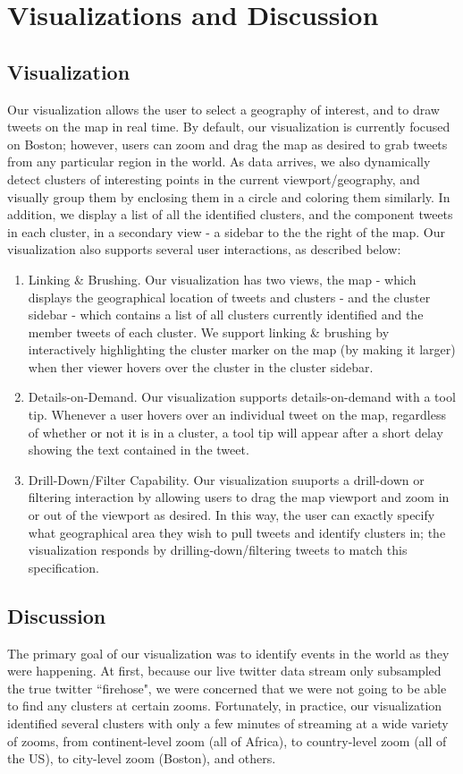 \documentclass[pdftex,12pt,a4paper]{article}
\begin{document}
\section{Visualizations and Discussion} 
\subsection{Visualization}
Our visualization allows the user to select a geography of interest, and to draw tweets on the map in real time. By default, our visualization is currently focused on Boston; however, users can zoom and drag the map as desired to grab tweets from any particular region in the world. As data arrives, we also dynamically detect clusters of interesting points in the current viewport/geography, and visually group them by enclosing them in a circle and coloring them similarly. In addition, we display a list of all the identified clusters, and the component tweets in each cluster, in a secondary view - a sidebar to the the right of the map. Our visualization also supports several user interactions, as described below:
\begin{enumerate}
\item Linking \& Brushing. Our visualization has two views, the map - which displays the geographical location of tweets and clusters - and the cluster sidebar - which contains a list of all clusters currently identified and the member tweets of each cluster. We support linking \& brushing by interactively highlighting the cluster marker on the map (by making it larger) when ther viewer hovers over the cluster in the cluster sidebar. 
\item Details-on-Demand. Our visualization supports details-on-demand with a tool tip. Whenever a user hovers over an individual tweet on the map, regardless of whether or not it is in a cluster, a tool tip will appear after a short delay showing the text contained in the tweet. 
\item Drill-Down/Filter Capability. Our visualization suuports a drill-down or filtering interaction by allowing users to drag the map viewport and zoom in or out of the viewport as desired. In this way, the user can exactly specify what geographical area they wish to pull tweets and identify clusters in; the visualization responds by drilling-down/filtering tweets to match this specification.
\end{enumerate}

\subsection{Discussion}
The primary goal of our visualization was to identify events in the world as they were happening. At first, because our live twitter data stream only subsampled the true twitter ``firehose", we were concerned that we were not going to be able to find any clusters at certain zooms. Fortunately, in practice, our visualization identified several clusters with only a few minutes of streaming at a wide variety of zooms, from continent-level zoom (all of Africa), to country-level zoom (all of the US), to city-level zoom (Boston), and others. 
\end{document}
